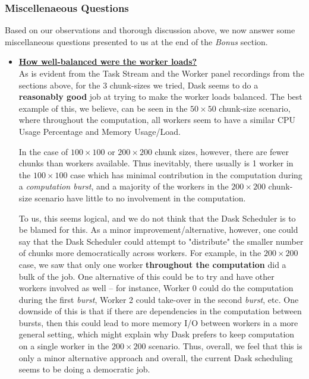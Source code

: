 \documentclass[a4paper,12pt]{article}
\begin{document}
\subsubsection{Miscellenaeous Questions}
Based on our observations and thorough discussion above, we now answer some miscellaneous questions presented to us at the end of the \textit{Bonus} section.

\begin{itemize}
\item \textbf{\underline{How well-balanced were the worker loads?}}\\
As is evident from the Task Stream and the Worker panel recordings from the sections above, for the 3 chunk-sizes we tried, Dask seems to do a \textbf{reasonably good} job at trying to make the worker loads balanced. The best example of this, we believe, can be seen in the $50 \times 50$ chunk-size scenario, where throughout the computation, all workers seem to have a similar CPU Usage Percentage and Memory Usage/Load. 

In the case of $100 \times 100$ or $200 \times 200$ chunk sizes, however, there are fewer chunks than workers available. Thus inevitably, there usually is 1 worker in the $100 \times 100$ case which has minimal contribution in the computation during a \textit{computation burst}, and a majority of the workers in the $200 \times 200$ chunk-size scenario have little to no involvement in the computation. 

To us, this seems logical, and we do not think that the Dask Scheduler is to be blamed for this. As a minor improvement/alternative, however, one could say that the Dask Scheduler could attempt to "distribute" the smaller number of chunks more democratically across workers. For example, in the $200 \times 200$ case, we saw that only one worker \textbf{throughout the computation} did a bulk of the job. One alternative of this could be to try and have other workers involved as well -- for instance, Worker 0 could do the computation during the first \textit{burst}, Worker 2 could take-over in the second \textit{burst}, etc. One downside of this is that if there are dependencies in the computation between bursts, then this could lead to more memory I/O between workers in a more general setting, which might explain why Dask prefers to keep computation on a single worker in the $200 \times 200$ scenario. Thus, overall, we feel that this is only a minor alternative approach and overall, the current Dask scheduling seems to be doing a democratic job. 


\end{itemize}
\end{document}
